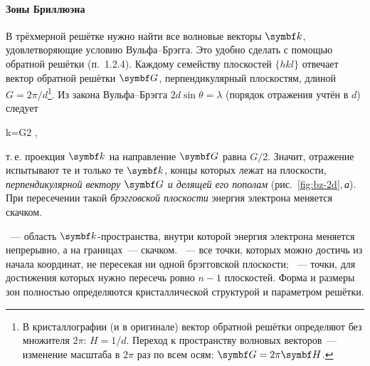 \paragraph{Зоны Бриллюэна}
В трёхмерной решётке нужно найти все волновые векторы $\vb k$,
удовлетворяющие условию Вульфа--Брэгга. Это удобно сделать с помощью
обратной решётки (п.~1.2.4). Каждому семейству плоскостей $\{hkl\}$
отвечает вектор обратной решётки $\vb G$, перпендикулярный плоскостям,
длиной $G=2\pi/d$\footnote{В кристаллографии (и в оригинале) вектор
обратной решётки определяют без множителя $2\pi$: $H=1/d$. Переход к
пространству волновых векторов~— изменение масштаба в $2\pi$ раз по
всем осям: $\vb G=2\pi\vb H$.}. Из закона Вульфа--Брэгга
$2d\sin\theta=\lambda$ (порядок отражения учтён в $d$) следует
\begin{keyeq}\label{eq:bragg-k}
k\sin\theta=\frac G2 ,
\end{keyeq}
т.\,е. проекция $\vb k$ на направление $\vb G$ равна $G/2$. Значит,
отражение испытывают те и только те $\vb k$, концы которых лежат на
плоскости, \emph{перпендикулярной вектору $\vb G$ и делящей его
пополам} (рис.~\ref{fig:bz-2d},\,\textit{а}). При пересечении такой
\emph{брэгговской плоскости} энергия электрона меняется скачком.

\begin{opredelenie}
~— область $\vb k$-пространства, внутри которой
энергия электрона меняется непрерывно, а на границах~— скачком.
~— все точки, которых можно достичь из начала
координат, не пересекая ни одной брэгговской плоскости; ~— точки, для достижения которых нужно пересечь ровно $n-1$
плоскостей. Форма и размеры зон полностью определяются кристаллической
структурой и параметром решётки.
\end{opredelenie}

